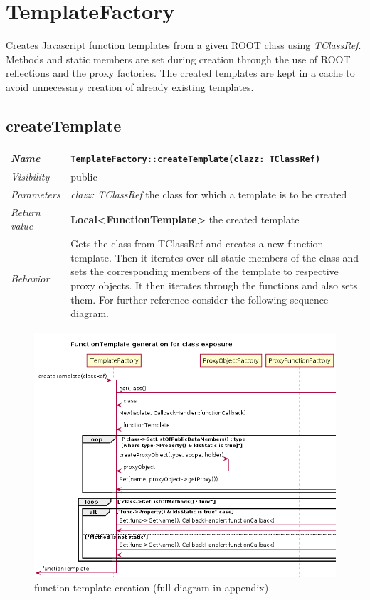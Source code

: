 \chapter{TemplateFactory}
Creates Javascript function templates from a given ROOT class using \textit{TClassRef}. Methods and static members are set during creation through the use of ROOT reflections and the proxy factories. 
The created templates are kept in a cache to avoid unnecessary creation of already existing templates.
\section{createTemplate}
\begin{longtable}{p{3cm} @{\hskip 1cm} p{12cm}}
 \hline
\textit{Name} & \texttt{TemplateFactory::createTemplate(clazz: TClassRef)}\\
\hline
 \textit{Visibility} & public\\
\hline
\textit{Parameters} & \textit{clazz: TClassRef} the class for which a template is to be created \\
\hline
\textit{Return value} & \textbf{ Local<FunctionTemplate>} the created template\\
  \hline
 \textit{Behavior} & Gets the class from TClassRef and creates a new function template. 
			Then it iterates over all static members of the class and sets the
			corresponding members of the template to respective proxy objects.
			It then iterates through the functions and also sets them.
			For further reference consider the following sequence diagram.\\
\hline
\end{longtable} \pagebreak
 
\begin{figure}[htb]
\includegraphics[width=16cm]{./latex/resources/functionTemplateGenerateCrop.png}
	\caption{function template creation (full diagram in appendix)}
\end{figure}
